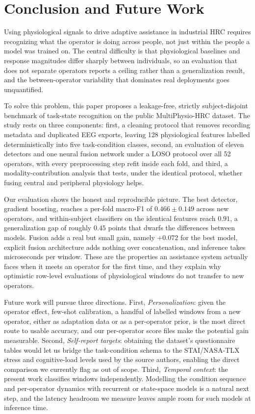 \documentclass{llncs}
\begin{document}
\section{Conclusion and Future Work}
\label{sec:conclusion}

Using physiological signals to drive adaptive assistance in industrial \ac{HRC}
requires recognizing what the operator is doing across people, not just within the
people a model was trained on. The central difficulty is that physiological baselines
and response magnitudes differ sharply between individuals, so an evaluation that does
not separate operators reports a ceiling rather than a generalization result, and the
between-operator variability that dominates real deployments goes unquantified.

To solve this problem, this paper proposes a leakage-free, strictly subject-disjoint
benchmark of task-state recognition on the public MultiPhysio-\ac{HRC} dataset. The
study rests on three components: first, a cleaning protocol that removes recording
metadata and duplicated \ac{EEG} exports, leaving 128 physiological features labelled
deterministically into five task-condition classes, second, an evaluation of eleven
detectors and one neural fusion network under a \ac{LOSO} protocol over all 52
operators, with every preprocessing step refit inside each fold, and third, a
modality-contribution analysis that tests, under the identical protocol, whether
fusing central and peripheral physiology helps.

Our evaluation shows the honest and reproducible picture. The best detector, gradient
boosting, reaches a per-fold macro-F1 of $0.466 \pm 0.149$ across new operators, and
within-subject classifiers on the identical features reach $0.91$, a generalization
gap of roughly $0.45$ points that dwarfs the differences between models. Fusion adds a
real but small gain, namely $+0.072$ for the best model, explicit fusion architecture
adds nothing over concatenation, and inference takes microseconds per window. These are the
properties an assistance system actually faces when it meets an operator for the first
time, and they explain why optimistic row-level evaluations of physiological windows
do not transfer to new operators.

Future work will pursue three directions. First, \emph{Personalization}: given the
operator effect, few-shot calibration, a handful of labelled windows from a new
operator, either as adaptation data or as a per-operator prior, is the most direct
route to usable accuracy, and our per-operator score files make the potential gain
measurable. Second, \emph{Self-report targets}: obtaining the dataset's questionnaire
tables would let us bridge the task-condition schema to the STAI/NASA-TLX stress and
cognitive-load levels used by the source authors, enabling the direct comparison we
currently flag as out of scope. Third, \emph{Temporal context}: the present work
classifies windows independently. Modelling the condition sequence and per-operator
dynamics with recurrent or state-space models is a natural next step, and the latency
headroom we measure leaves ample room for such models at inference time.



\end{document}
